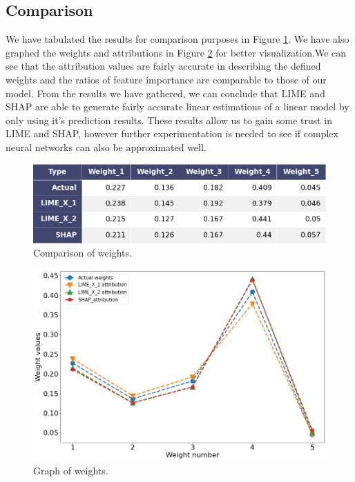 \subsection{Comparison}
We have tabulated the results for comparison purposes in Figure \ref{fig:weight-tab}. We have also graphed the weights and attributions in Figure \ref{fig:weight-graph} for better visualization.We can see that the attribution values are fairly accurate in describing the defined weights and the ratios of feature importance are comparable to those of our model. From the results we have gathered, we can conclude that LIME and SHAP are able to generate fairly accurate linear estimations of a linear model by only using it's prediction results. These results allow us to gain some trust in LIME and SHAP, however further experimentation is needed to see if complex neural networks can also be approximated well.
\begin  {figure}[!htpb]
  \includegraphics[width=\linewidth]{Evaluation_Images/weight_table.png}
   \caption{Comparison of weights.}
    \label{fig:weight-tab}
\end{figure}

\begin  {figure}[!htpb]
  \includegraphics[width=\linewidth]{Evaluation_Images/weight_comp.png}
   \caption{Graph of weights.}
    \label{fig:weight-graph}
\end{figure}



